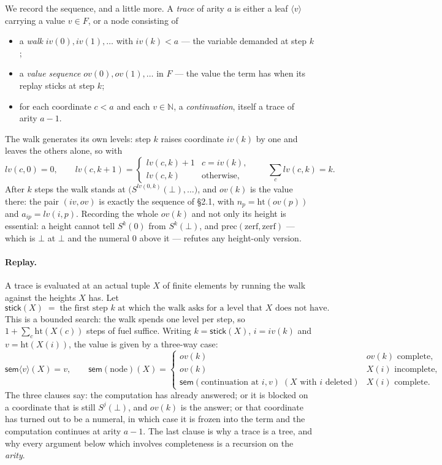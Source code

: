 \documentclass[11pt]{article}
\newcommand{\N}{\mathbb{N}}
\newcommand{\Fin}{F}
\newcommand{\hgt}{\mathrm{ht}}
\newcommand{\ovv}{\mathit{ov}}
\newcommand{\ivv}{\mathit{iv}}
\newcommand{\lvv}{\mathit{lv}}
\newcommand{\stick}{\mathsf{stick}}
\newcommand{\sem}{\mathsf{sem}}
\theoremstyle{definition}
\begin{document}
We record the sequence, and a little more. A \emph{trace} of arity $a$ is
either a leaf $\langle v \rangle$ carrying a value $v \in \Fin$, or a node
consisting of
\begin{itemize}
\item a \emph{walk} $\ivv(0),\ivv(1),\dots$ with $\ivv(k) < a$ --- the
  variable demanded at step $k$;
\item a \emph{value sequence} $\ovv(0),\ovv(1),\dots$ in $\Fin$ --- the
  value the term has when its replay sticks at step $k$;
\item for each coordinate $c < a$ and each $v \in \N$, a
  \emph{continuation}, itself a trace of arity $a-1$.
\end{itemize}
The walk generates its own levels: step $k$ raises coordinate $\ivv(k)$ by
one and leaves the others alone, so with
\[
\lvv(c,0)=0,\qquad
\lvv(c,k{+}1) = \begin{cases}\lvv(c,k)+1 & c = \ivv(k),\\
                             \lvv(c,k) & \text{otherwise,}\end{cases}
\qquad \sum_c \lvv(c,k) = k .
\]
After $k$ steps the walk stands at
$\bigl(S^{\lvv(0,k)}(\bot),\dots\bigr)$, and $\ovv(k)$ is the value there:
the pair $(\ivv,\ovv)$ is exactly the sequence of \S2.1, with $n_p =
\hgt(\ovv(p))$ and $a_{ip} = \lvv(i,p)$. Recording the whole $\ovv(k)$ and
not only its height is essential: a height cannot tell $S^k(0)$ from
$S^k(\bot)$, and $\mathrm{prec}(\mathrm{zerf},\mathrm{zerf})$ --- which is
$\bot$ at $\bot$ and the numeral $0$ above it --- refutes any height-only
version.

\paragraph{Replay.} A trace is evaluated at an actual tuple $X$ of finite
elements by running the walk against the heights $X$ has. Let
\[
\stick(X) \;=\; \text{the first step $k$ at which the walk asks for a
level that $X$ does not have.}
\]
This is a bounded search: the walk spends one level per step, so
$1+\sum_c \hgt(X(c))$ steps of fuel suffice. Writing $k = \stick(X)$,
$i = \ivv(k)$ and $v = \hgt(X(i))$, the value is given by a three-way case:
\[
\sem\langle v\rangle(X) = v, \qquad
\sem(\text{node})(X) =
\begin{cases}
\ovv(k) & \text{$\ovv(k)$ complete,}\\
\ovv(k) & \text{$X(i)$ incomplete,}\\
\sem(\text{continuation at } i, v)\;(X \text{ with } i \text{ deleted})
        & \text{$X(i)$ complete.}
\end{cases}
\]
The three clauses say: the computation has already answered; or it is
blocked on a coordinate that is still $S^j(\bot)$, and $\ovv(k)$ is the
answer; or that coordinate has turned out to be a numeral, in which case
it is frozen into the term and the computation continues at arity $a-1$.
The last clause is why a trace is a tree, and why every argument below
which involves completeness is a recursion on the \emph{arity}.
\end{document}
